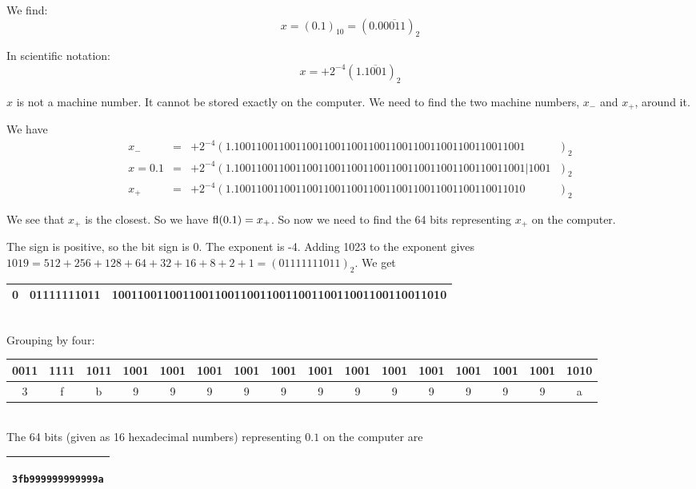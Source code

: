 \documentclass[pdftex,11pt]{article}
\begin{document}
\begin{enumerate}
We find:
$$x = (0.1)_{10} = (0.0\overline{0011})_2 $$

In scientific notation:
$$x = + 2^{-4} (1.\overline{1001})_2 $$

$x$ is not a machine number. It cannot be stored exactly on the computer. We
need to find the two machine numbers, $x_-$ and $x_+$, around it.

We have
\begin{eqnarray}
 \nonumber x_-       & = &  + 2^{-4} ( 1.1001100110011001100110011001100110011001100110011001\phantom{|1001}~~~)_2\\
 \nonumber x = 0.1   & = &  + 2^{-4} ( 1.1001100110011001100110011001100110011001100110011001|1001~~~)_2\\
 \nonumber x_+       & = &  + 2^{-4} ( 1.1001100110011001100110011001100110011001100110011010\phantom{|1001}~~~)_2
\end{eqnarray}

We see that $x_+$ is the closest. So we have $\textmd{fl}(0.1) = x_+$. So now we need to find the 
64 bits representing $x_+$ on the computer.

The sign is positive, so the bit sign is $0$.
The exponent is -4. Adding 1023 to the exponent gives $1019 =
512+256+128+64+32+16+8+2+1 = (01111111011)_2.$
We get\\

\begin{tabular}{|c|c|c|}
\hline
0 & 01111111011 & 1001100110011001100110011001100110011001100110011010 \\
\hline
\end{tabular}\\

Grouping by four:\\

\begin{tabular}{|c|c|c|c|c|c|c|c|c|c|c|c|c|c|c|c|}
\hline
0011&1111&1011&1001&1001&1001&1001&1001&1001&1001&1001&1001&1001&1001&1001&1010\\
\hline
3&f&b&9&9&9&9&9&9&9&9&9&9&9&9&a\\
\hline
\end{tabular}\\

The 64 bits (given as 16 hexadecimal numbers) representing $0.1$ on the computer are

\begin{center}
\begin{tabular}{|c|}
\hline
\begin{minipage}{0.17\textwidth}
\begin{verbatim}
3fb999999999999a
\end{verbatim}
\end{minipage}\\
\hline
\end{tabular}
\end{center}




\end{enumerate}
\end{document}

